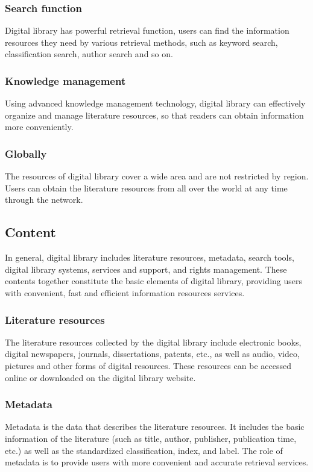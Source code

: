 \subsubsection{Search function}
Digital library has powerful retrieval function, users can find the information resources they need by various retrieval methods, such as keyword search, classification search, author search and so on.

\subsubsection{Knowledge management}
Using advanced knowledge management technology, digital library can effectively organize and manage literature resources, so that readers can obtain information more conveniently.

\subsubsection{Globally}
The resources of digital library cover a wide area and are not restricted by region. Users can obtain the literature resources from all over the world at any time through the network.

\subsection{Content}
In general, digital library includes literature resources, metadata, search tools, digital library systems, services and support, and rights management. These contents together constitute the basic elements of digital library, providing users with convenient, fast and efficient information resources services. 
 
\subsubsection{Literature resources}
The literature resources collected by the digital library include electronic books, digital newspapers, journals, dissertations, patents, etc., as well as audio, video, pictures and other forms of digital resources. These resources can be accessed online or downloaded on the digital library website.

\subsubsection{Metadata}
Metadata is the data that describes the literature resources. It includes the basic information of the literature (such as title, author, publisher, publication time, etc.) as well as the standardized classification, index, and label. The role of metadata is to provide users with more convenient and accurate retrieval services.


